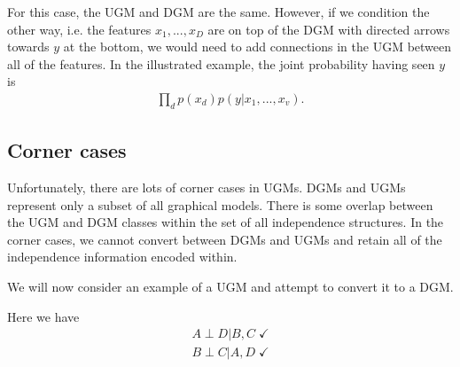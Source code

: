\documentclass{article}
\begin{document}
For this case, the UGM and DGM are the same. However, if we condition the other way, i.e. the features $x_1, ..., x_D$ are on top of the DGM with directed arrows towards $y$ at the bottom, we would need to add connections in the UGM between all of the features. In the illustrated example, the joint probability having seen $y$ is
\begin{align}
\prod_d p(x_d) p(y|x_1,...,x_v).
\end{align}

\subsection{Corner cases}

Unfortunately, there are lots of corner cases in UGMs. DGMs and UGMs represent only a subset of all graphical models. There is some overlap between the UGM and DGM classes within the set of all independence structures. In the corner cases, we cannot convert between DGMs and UGMs and retain all of the independence information encoded within.

\begin{center}
\end{center}
\smallskip

We will now consider an example of a UGM and attempt to convert it to a DGM.
\begin{center}
\end{center}
Here we have
\begin{align}
A \perp D|B,C \; \checkmark\\
B \perp C|A,D \; \checkmark\\
\end{align}
\end{document}
